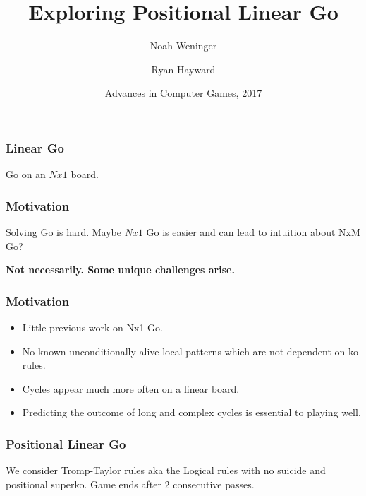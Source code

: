 \documentclass{beamer}
\title{Exploring Positional Linear Go}
\author[Weninger, Hayward]
{Noah Weninger \and Ryan Hayward}
\institute[University of Alberta]
{
  Department of Computing Science\\
  University of Alberta\\
  Canada
}
\date[ACG 2017]
{Advances in Computer Games, 2017}
\begin{document}
    \frame{\titlepage}

    \begin{frame}
        \frametitle{Linear Go}
        Go on an $Nx1$ board.
        \bigskip
        \begin{center}
            \cleargoban
            \showgoban[b2,j2]
        \end{center}
    \end{frame}

    \begin{frame}
        \frametitle{Motivation}
        Solving Go is hard. Maybe $Nx1$ Go is easier and can lead to intuition about NxM Go?
        \begin{center}
            \textbf{Not necessarily. Some unique challenges arise.}
        \end{center}
    \end{frame}
    \begin{frame}
        \frametitle{Motivation}
        \begin{itemize}[<+->]
            \item Little previous work on Nx1 Go.
            \item No known unconditionally alive local patterns which are not dependent on ko rules.
            \item Cycles appear much more often on a linear board.
            \item Predicting the outcome of long and complex cycles is essential to playing well.
        \end{itemize}
    \end{frame}

    \begin{frame}
        \frametitle{Positional Linear Go}
        We consider Tromp-Taylor rules aka the Logical rules with no suicide and positional superko. Game ends after 2 consecutive passes.
        \bigskip
        \begin{center}
            \cleargoban
            \showgoban[b2,h2]\\\medskip
            \pause
            \showgoban[b2,h2]\\\medskip
            \pause
            \showgoban[b2,h2]\\\medskip
            \pause
            \showgoban[b2,h2]\\\medskip
            \pause
            \showgoban[b2,h2]\\\medskip
            \pause
            \showgoban[b2,h2]\\\medskip
            \pause
            \showgoban[b2,h2]\\\medskip
            \pause
            \showgoban[b2,h2]\\\medskip
        \end{center}
    \end{frame}
\end{document}
